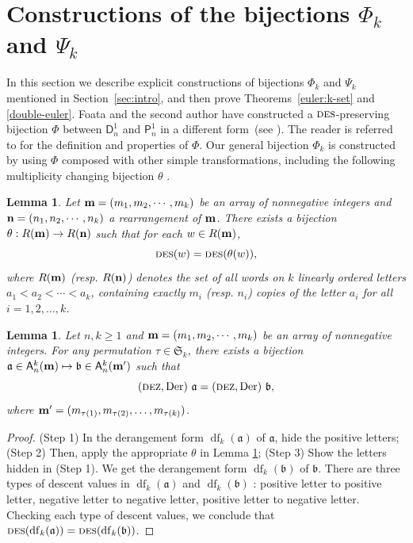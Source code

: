 \documentclass[12pt]{amsart}
\numberwithin{equation}{section}
\theoremstyle{plain}
\newtheorem{lemma}[theorem]{Lemma}
\theoremstyle{definition}
\newcommand\A{\mathsf{A}}
\renewcommand\P{\mathsf{P}}
\newcommand\D{\mathsf{D}}
\def\Der{\mathrm{Der}}
\def\DES{\hbox{\rm\textsc{des}}}
\def\DEZ{\hbox{\rm\textsc{dez}}}
\def\S{\mathfrak{S}}
\def\a{\mathfrak{a}}
\def\b{\mathfrak{b}}
\def\df{\operatorname{df}}
\begin{document}
\section{Constructions of the bijections \texorpdfstring{$\Phi_k$ and $\Psi_k$}{Phi-k and Psi-k}}\label{sec:desdez:sym}
\label{sec:3} 
In this section we describe explicit constructions of bijections $\Phi_k$ and $\Psi_k$ mentioned in Section~\ref{sec:intro}, and then prove Theorems~\ref{euler:k-set} and \ref{double-euler}.
Foata and the second author have constructed a $\DES$-preserving bijection $\Phi$ between $\D_n^1$ and $\P_n^1$ in a different form~(see \cite[Thm.~1.1]{fh1}). 
The reader is referred to \cite{fh1} for the definition and properties of $\Phi$. Our general bijection $\Phi_k$ is constructed by using $\Phi$ composed with other simple transformations, including the following multiplicity changing bijection $\theta$ 
\cite[Section 4]{han1992}. 
\begin{lemma}\label{lemma:mul0}
Let  
${\bf m}=(m_1, m_2, \cdots, m_k)$ be an array of nonnegative integers
and 
${\bf n}=(n_1, n_2, \cdots, n_k)$ a rearrangement of ${\bf m}$.
There exists a bijection 
	$\theta: R({\bf m}) \rightarrow R({\bf n})$ such that for each $w \in R({\bf m})$,
$$
	\DES(w) = \DES(\theta(w)),
	$$
	where $R({\bf m})$ (resp. $R({\bf n})$) denotes the set of all words on $k$ linearly ordered letters $a_1<a_2<\cdots<a_k$, containing exactly $m_i$ (resp. $n_i$) copies of the letter $a_i$ for all $i=1,2,\ldots, k$.
\end{lemma}

\begin{lemma}\label{lemma:mul1}
Let $n,k\geq1$ and 
${\bf m}=(m_1, m_2, \cdots, m_k)$ be an array of nonnegative integers.
For any permutation $\tau\in \S_k$,
	there exists a bijection 
	$\a \in \A_n^k({\bf m}) \mapsto \b \in \A_n^k({\bf m'})$ such that 
\begin{equation}
(\DEZ,  \Der)~\a = (\DEZ,  \Der)~\b,
\end{equation}
where ${\bf m'} = (m_{\tau(1)}, m_{\tau(2)}, \ldots, m_{\tau(k)})$.
\end{lemma}
\begin{proof}
	(Step 1)	In the derangement form $\df_k(\a)$ of $\a$, hide the positive letters; (Step 2) Then, apply the appropriate $\theta$ in Lemma \ref{lemma:mul0}; (Step 3) Show the letters hidden in (Step 1). We get the derangement form 
	$\df_k(\b)$ of $\b$. 
	There are three types of descent values in $\df_k(\a)$ and $\df_k(\b)$ : positive letter to positive letter, negative letter to negative letter, positive letter to negative letter. Checking each type of descent values, we conclude that $\DES(\df_k(\a))=\DES(\df_k(\b))$.
\end{proof}
\end{document}
